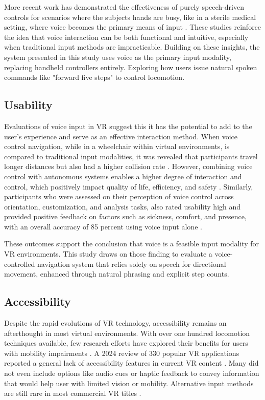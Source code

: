 \documentclass[manuscript, screen, review]{acmart}
\begin{document}
More recent work has demonstrated the effectiveness of purely speech-driven controls for scenarios where the subjects hands are busy, like in a sterile medical setting, where voice becomes the primary means of input \cite{a2}. These studies reinforce the idea that voice interaction can be both functional and intuitive, especially when traditional input methods are impracticable. Building on these insights, the system presented in this study uses voice as the primary input modality, replacing handheld controllers entirely. Exploring how users issue natural spoken commands like "forward five steps" to control locomotion.



\subsection{Usability}
Evaluations of voice input in VR suggest this it has the potential to add to the user's experience \cite{a3} and serve as an effective interaction method. When voice control navigation, while in a wheelchair within virtual environments, is compared to traditional input modalities, it was revealed that participants travel longer distances but also had a higher collision rate \cite{a3}. However, combining voice control with autonomous systems enables a higher degree of interaction and control, which positively impact quality of life, efficiency, and safety \cite{a3}. Similarly, participants who were assessed on their perception of voice control across orientation, customization, and analysis tasks, also rated usability high and provided positive feedback on factors such as sickness, comfort, and presence, with an overall accuracy of 85 percent using voice input alone \cite{a2}. 

These outcomes support the conclusion that voice is a feasible input modality for VR environments. This study draws on those finding to evaluate a voice-controlled navigation system that relies solely on speech for directional movement, enhanced through natural phrasing and explicit step counts.

\subsection{Accessibility}

Despite the rapid evolutions of VR technology, accessibility remains an afterthought in most virtual environments. With over one hundred locomotion techniques available, few research efforts have explored their benefits for users with mobility impairments \cite{a4}. A 2024 review of 330 popular VR applications reported a general lack of accessibility features in current VR content \cite{a5}. Many did not even include options like audio cues or haptic feedback to convey information that would help user with limited vision or mobility. Alternative input methods are still rare in most commercial VR titles \cite{a5}. 
\end{document}
